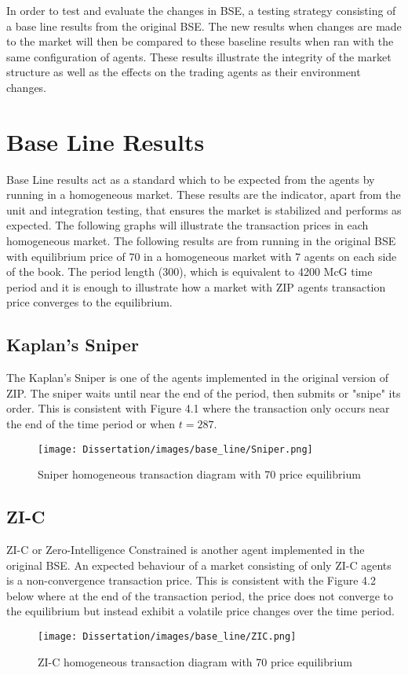 In order to test and evaluate the changes in BSE, a testing strategy consisting of a base line results from the original BSE. The new results when changes are made to the market will then be compared to these baseline results when ran with the same configuration of agents. These results illustrate the integrity of the market structure as well as the effects on the trading agents as their environment changes. 

\section{Base Line Results} 
Base Line results act as a standard which to be expected from the agents by running in a homogeneous market. These results are the indicator, apart from the unit and integration testing, that ensures the market is stabilized and performs as expected. The following graphs will illustrate the transaction prices in each homogeneous market. The following results are from running in the original BSE with equilibrium price of 70 in a homogeneous market with 7 agents on each side of the book. The period length (300), which is equivalent to 4200 McG time period and it is enough to illustrate how a market with ZIP agents transaction price converges to the equilibrium. 

\subsection{Kaplan's Sniper}
The Kaplan's Sniper is one of the agents implemented in the original version of ZIP. The sniper waits until near the end of the period, then submits or "snipe" its order. This is consistent with Figure 4.1 where the transaction only occurs near the end of the time period or when $t = 287$. 

\begin{figure}[!htbp]
\texttt{[image: Dissertation/images/base\_line/Sniper.png]}
\caption{Sniper homogeneous transaction diagram with 70 price equilibrium} 
\end{figure} 
\FloatBarrier

\subsection{ZI-C}
ZI-C or Zero-Intelligence Constrained is another agent implemented in the original BSE. An expected behaviour of a market consisting of only ZI-C agents is a non-convergence transaction price. This is consistent with the Figure 4.2 below where at the end of the transaction period, the price does not converge to the equilibrium but instead exhibit a volatile price changes over the time period. 
\begin{figure}[h]
\caption{ZI-C homogeneous transaction diagram with 70 price equilibrium} 
\texttt{[image: Dissertation/images/base\_line/ZIC.png]}
\end{figure} 
\FloatBarrier

